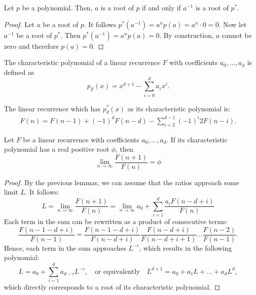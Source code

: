 \documentclass[english,version-2020-11]{uzl-thesis}
\begin{document}
\begin{lemma}
  Let $p$ be a polynomial. Then, $a$ is a root of $p$ if and only if $a^{-1}$ is a root of $p^*$.
\end{lemma}

\begin{proof}
  Let $a$ be a root of $p$. It follows $p^*(a^{-1}) = a^n p(a) = a^n \cdot 0 = 0$.
  Now let $a^{-1}$ be a root of $p^*$. Then $p^*(a^{-1}) = a^n p(a) = 0$.
  By construction, $a$ cannot be zero and therefore $p(a) = 0$.
\end{proof}

\begin{definition}
  The characteristic polynomial of a linear recurrence $F$ with coefficients
  $a_0, \dots, a_d$ is defined as
  \[
    p_F(x) = x^{d+1} - \sum_{i = 0}^d a_i x^i.
  \]
\end{definition}

\begin{example}
  The linear recurrence which has $p_d^*(x)$ as its characteristic polynomial is:
  \begin{align*}
    F(n) = F(n - 1) + (-1)^d F(n - d) - \sum_{i=2}^{d - 1} (-1)^{i} 2 F(n - i).
  \end{align*}
\end{example}

\begin{lemma}
  Let $F$ be a linear recurrence with coefficients $a_0, \dots, a_d$.
  If its characteristic polynomial has a real positive root $\phi$, then
  \[
    \lim_{n \to \infty} \frac{F(n + 1)}{F(n)} = \phi
  \]
\end{lemma}

\begin{proof}
  By the previous lemmas, we can assume that the ratios approach some limit $L$.
  It follows:
  \[
    L
    = \lim_{n \to \infty} \frac{F(n + 1)}{F(n)}
    = \lim_{n \to \infty} a_0 + \sum_{i = 1}^d \frac{a_i F(n - d + i)}{F(n)}
  \]
  Each term in the sum can be rewritten as a product of consecutive terms:
  \[
    \frac{F(n - 1 - d + i)}{F(n - 1)}
    = \frac{F(n - 1 - d + i)}{F(n - d + i)} \frac{F(n - d + i)}{F(n - d + i + 1)} \dots \frac{F(n - 2)}{F(n-1)}.
  \]
  Hence, each term in the sum approaches $L^{-i}$,
  which results in the following polynomial:
  \[
    L = a_0 + \sum_{i = 1}^d a_{d - i} L^{-i},
    \quad \text{or equivalently} \quad
    L^{d+1} = a_0 + a_1 L + \dots + a_d L^d,
  \]
  which directly corresponds to a root of its characteristic polynomial.
\end{proof}
\end{document}
